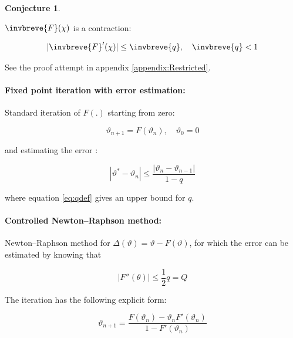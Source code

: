 \documentclass{article}
\theoremstyle{definition}
\newtheorem{conjecture}{Conjecture}[section]
\begin{document}
\begin{conjecture}
\label{conj:Restricted}

    $\invbreve{F}(\chi)$ is a contraction:

    \begin{equation}
        |\invbreve{F}'(\chi)| \le \invbreve{q}, \quad \invbreve{q}<1
    \end{equation}
    
\end{conjecture}

See the proof attempt in appendix \ref{appendix:Restricted}.


\paragraph{Fixed point iteration with error estimation:}

Standard iteration of $F(.)$ starting from zero:

\begin{equation}
    \vartheta_{n+1} = F(\vartheta_n), \quad \vartheta_0 = 0
\end{equation}

and estimating the error \cite{book:BanachFixedPoint}:

\begin{equation}
    |\vartheta^* - \vartheta_n| \le \frac{|\vartheta_n-\vartheta_{n-1}|}{1-q}
\end{equation}

where equation \eqref{eq:qdef} gives an upper bound for $q$.

\paragraph{Controlled Newton–Raphson method:}

Newton–Raphson method \cite{book:NumericalRecipes} for $\Delta(\vartheta) = \vartheta - F(\vartheta)$, for which the error can be estimated by knowing that 

\begin{equation}
    |F''(\theta)| \le \frac{1}{2} q = Q
\end{equation}

The iteration has the following explicit form:

\begin{equation}
    \vartheta_{n+1} = \frac{F(\vartheta_n) - \vartheta_n F'(\vartheta_n)}{1-F'(\vartheta_n)}
\end{equation}
\end{document}
